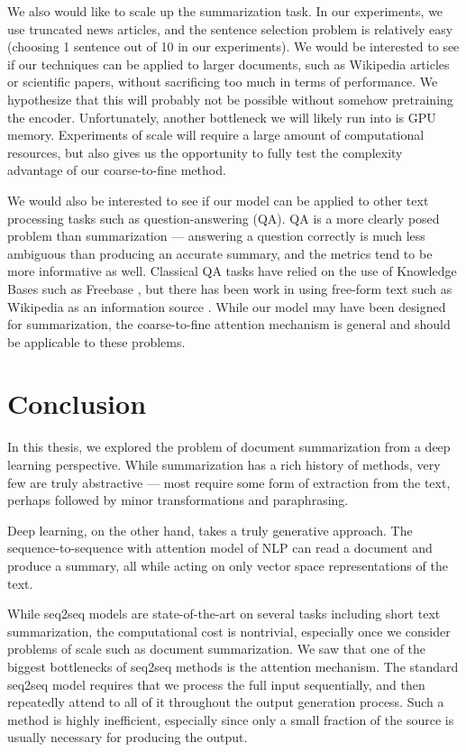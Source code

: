 \documentclass[12pt]{report}
\begin{document}
We also would like to scale up the summarization task. In our experiments, we use truncated news articles, and the sentence selection problem is relatively easy (choosing 1 sentence out of 10 in our experiments). 
We would be interested to see if our techniques can be applied to larger documents, such as Wikipedia articles or scientific papers, without sacrificing too much in terms of performance. We hypothesize that this will probably not be possible without somehow pretraining the encoder.
Unfortunately, another bottleneck we will likely run into is GPU memory. Experiments of scale will require a large amount of computational resources, but also gives us the opportunity to  fully test the complexity advantage of our coarse-to-fine method.

We would also be interested to see if our model can be applied to other text processing tasks such as question-answering (QA). QA is a more clearly posed problem than summarization --- answering a question correctly is much less ambiguous than producing an accurate summary, and the metrics tend to be more informative as well.
Classical QA tasks have relied on the use of Knowledge Bases such as Freebase \citep{Bollacker2008}, but there has been work in using free-form text such as Wikipedia as an information source \citep{Miller2016}. While our model may have been designed for summarization, the coarse-to-fine attention mechanism is general and should be applicable to these problems.

\chapter{Conclusion}
\label{chap:conclusion}

In this thesis, we explored the problem of document summarization from a deep learning perspective. While summarization has a rich history of methods, very few are truly abstractive --- most require some form of extraction from the text, perhaps followed by minor transformations and paraphrasing.

Deep learning, on the other hand, takes a truly generative approach. The sequence-to-sequence with attention model of NLP can read a document and produce a summary, all while acting on only vector space representations of the text. 

While seq2seq models are state-of-the-art on several tasks including short text summarization, the computational cost is nontrivial, especially once we consider problems of scale such as document summarization.
We saw that one of the biggest bottlenecks of seq2seq methods is the attention mechanism. The standard seq2seq model requires that we process the full input sequentially, and then repeatedly attend to all of it throughout the output generation process. Such a method is highly inefficient, especially since only a small fraction of the source is usually necessary for producing the output.
\end{document}
